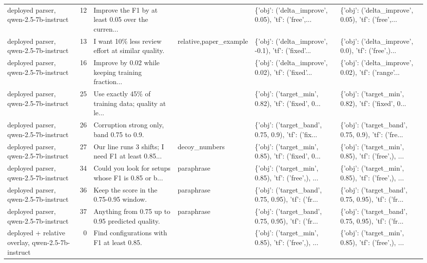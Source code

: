 \begin{tabular}{lrllll}
            deployed parser, qwen-2.5-7b-instruct &   12 & Improve the F1 by at least 0.05 over the curren... &                        & \{'obj': ('delta\_improve', 0.05), 'tf': ('free',... & \{'obj': ('delta\_improve', 0.05), 'tf': ('free',... \\
            deployed parser, qwen-2.5-7b-instruct &   13 &  I want 10\% less review effort at similar quality. & relative,paper\_example & \{'obj': ('delta\_improve', -0.1), 'tf': ('fixed'... & \{'obj': ('delta\_improve', 0.0), 'tf': ('free',)... \\
            deployed parser, qwen-2.5-7b-instruct &   16 & Improve by 0.02 while keeping training fraction... &                        & \{'obj': ('delta\_improve', 0.02), 'tf': ('fixed'... & \{'obj': ('delta\_improve', 0.02), 'tf': ('range'... \\
            deployed parser, qwen-2.5-7b-instruct &   25 & Use exactly 45\% of training data; quality at le... &                        & \{'obj': ('target\_min', 0.82), 'tf': ('fixed', 0... & \{'obj': ('target\_min', 0.82), 'tf': ('fixed', 0... \\
            deployed parser, qwen-2.5-7b-instruct &   26 &          Corruption strong only, band 0.75 to 0.9. &                        & \{'obj': ('target\_band', 0.75, 0.9), 'tf': ('fix... & \{'obj': ('target\_band', 0.75, 0.9), 'tf': ('fre... \\
            deployed parser, qwen-2.5-7b-instruct &   27 & Our line runs 3 shifts; I need F1 at least 0.85... &          decoy\_numbers & \{'obj': ('target\_min', 0.85), 'tf': ('fixed', 0... & \{'obj': ('target\_min', 0.85), 'tf': ('free',), ... \\
            deployed parser, qwen-2.5-7b-instruct &   34 & Could you look for setups whose F1 is 0.85 or b... &             paraphrase & \{'obj': ('target\_min', 0.85), 'tf': ('free',), ... & \{'obj': ('target\_min', 0.85), 'tf': ('free',), ... \\
            deployed parser, qwen-2.5-7b-instruct &   36 &            Keep the score in the 0.75-0.95 window. &             paraphrase & \{'obj': ('target\_band', 0.75, 0.95), 'tf': ('fr... & \{'obj': ('target\_band', 0.75, 0.95), 'tf': ('fr... \\
            deployed parser, qwen-2.5-7b-instruct &   37 &   Anything from 0.75 up to 0.95 predicted quality. &             paraphrase & \{'obj': ('target\_band', 0.75, 0.95), 'tf': ('fr... & \{'obj': ('target\_band', 0.75, 0.95), 'tf': ('fr... \\
deployed + relative overlay, qwen-2.5-7b-instruct &    0 &         Find configurations with F1 at least 0.85. &                        & \{'obj': ('target\_min', 0.85), 'tf': ('free',), ... & \{'obj': ('target\_min', 0.85), 'tf': ('free',), ... \\

\end{tabular}
